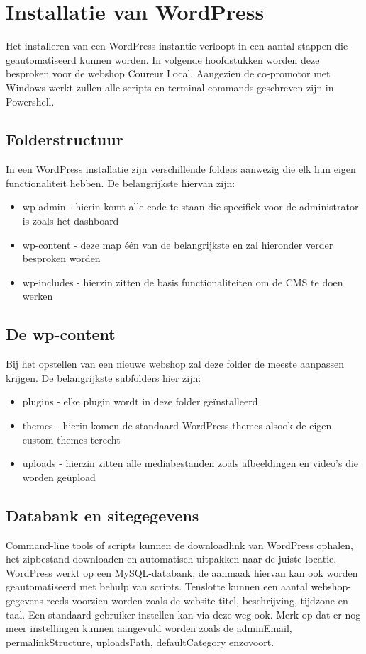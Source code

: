 \section{Installatie van WordPress}
Het installeren van een WordPress instantie verloopt in een aantal stappen die geautomatiseerd kunnen worden. In volgende hoofdstukken worden deze besproken voor de webshop Coureur Local. Aangezien de co-promotor met Windows werkt zullen alle scripts en terminal commands geschreven zijn in Powershell.

\subsection{Folderstructuur}
In een WordPress installatie zijn verschillende folders aanwezig die elk hun eigen functionaliteit hebben. De belangrijkste hiervan zijn:
\begin{itemize}
    \item wp-admin - hierin komt alle code te staan die specifiek voor de administrator is zoals het dashboard
    \item wp-content - deze map één van de belangrijkste en zal hieronder verder besproken worden
    \item wp-includes - hierzin zitten de basis functionaliteiten om de CMS te doen werken
\end{itemize} 

\subsection{De wp-content}
Bij het opstellen van een nieuwe webshop zal deze folder de meeste aanpassen krijgen. De belangrijkste subfolders hier zijn:
\begin{itemize}
    \item plugins - elke plugin wordt in deze folder geïnstalleerd
    \item themes - hierin komen de standaard WordPress-themes alsook de eigen custom themes terecht
    \item uploads - hierzin zitten alle mediabestanden zoals afbeeldingen en video's die worden geüpload 
\end{itemize} 

\subsection{Databank en sitegegevens}
Command-line tools of scripts kunnen de downloadlink van WordPress ophalen, het zipbestand downloaden en automatisch uitpakken naar de juiste locatie. WordPress werkt op een MySQL-databank, de aanmaak hiervan kan ook worden geautomatiseerd met behulp van scripts. Tenslotte kunnen een aantal webshop-gegevens reeds voorzien worden zoals de website titel, beschrijving, tijdzone en taal. Een standaard gebruiker instellen kan via deze weg ook. Merk op dat er nog meer instellingen kunnen aangevuld worden zoals de adminEmail, permalinkStructure, uploadsPath, defaultCategory enzovoort.

